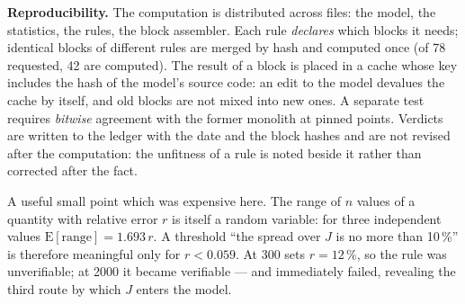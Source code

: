 \textbf{Reproducibility.} The computation is distributed across files: the model, the statistics, the rules, the block assembler. Each rule \emph{declares} which blocks it needs; identical blocks of different rules are merged by hash and computed once (of 78 requested, 42 are computed). The result of a block is placed in a cache whose key includes the hash of the model's source code: an edit to the model devalues the cache by itself, and old blocks are not mixed into new ones. A separate test requires \emph{bitwise} agreement with the former monolith at pinned points. Verdicts are written to the ledger with the date and the block hashes and are not revised after the computation: the unfitness of a rule is noted beside it rather than corrected after the fact.

\begin{ineq}
A useful small point which was expensive here. The range of $n$ values of a quantity with relative error $r$ is itself a random variable: for three independent values $\mathrm{E}[\text{range}]=1.693\,r$. A threshold ``the spread over $J$ is no more than 10\,\%'' is therefore meaningful only for $r<0.059$. At 300 sets $r=12$\,\%, so the rule was unverifiable; at 2000 it became verifiable --- and immediately failed, revealing the third route by which $J$ enters the model.
\end{ineq}
